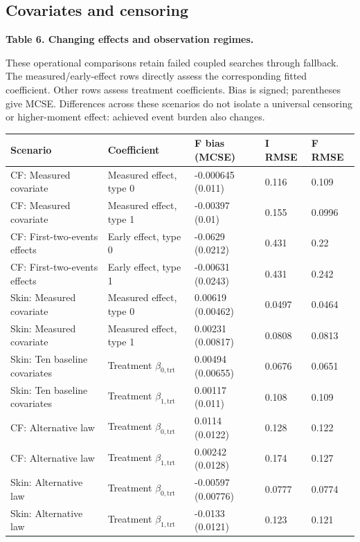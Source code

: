 \documentclass[11pt]{article}
\begin{document}
\subsection{Covariates and censoring}\label{sec:6.7}

\label{tab:6}
\textbf{Table 6. Changing effects and observation regimes.}

These operational comparisons retain failed coupled searches through fallback. The measured/early-effect rows directly assess the corresponding fitted coefficient. Other rows assess treatment coefficients. Bias is signed; parentheses give MCSE. Differences across these scenarios do not isolate a universal censoring or higher-moment effect: achieved event burden also changes.

{\footnotesize\setlength{\tabcolsep}{4pt}
\begin{longtable}{lllll}
\toprule
\textbf{Scenario} & \textbf{Coefficient} & \textbf{F bias (MCSE)} & \textbf{I RMSE} & \textbf{F RMSE} \\
\midrule
\endhead
\bottomrule
\endlastfoot
CF: Measured covariate & Measured effect, type 0 & -0.000645 (0.011) & 0.116 & 0.109 \\
CF: Measured covariate & Measured effect, type 1 & -0.00397 (0.01) & 0.155 & 0.0996 \\
CF: First-two-events effects & Early effect, type 0 & -0.0629 (0.0212) & 0.431 & 0.22 \\
CF: First-two-events effects & Early effect, type 1 & -0.00631 (0.0243) & 0.431 & 0.242 \\
Skin: Measured covariate & Measured effect, type 0 & 0.00619 (0.00462) & 0.0497 & 0.0464 \\
Skin: Measured covariate & Measured effect, type 1 & 0.00231 (0.00817) & 0.0808 & 0.0813 \\
Skin: Ten baseline covariates & Treatment \(\beta_{0,\mathrm{trt}}\) & 0.00494 (0.00655) & 0.0676 & 0.0651 \\
Skin: Ten baseline covariates & Treatment \(\beta_{1,\mathrm{trt}}\) & 0.00117 (0.011) & 0.108 & 0.109 \\
CF: Alternative law & Treatment \(\beta_{0,\mathrm{trt}}\) & 0.0114 (0.0122) & 0.128 & 0.122 \\
CF: Alternative law & Treatment \(\beta_{1,\mathrm{trt}}\) & 0.00242 (0.0128) & 0.174 & 0.127 \\
Skin: Alternative law & Treatment \(\beta_{0,\mathrm{trt}}\) & -0.00597 (0.00776) & 0.0777 & 0.0774 \\
Skin: Alternative law & Treatment \(\beta_{1,\mathrm{trt}}\) & -0.0133 (0.0121) & 0.123 & 0.121 \\

\end{longtable}}
\end{document}
